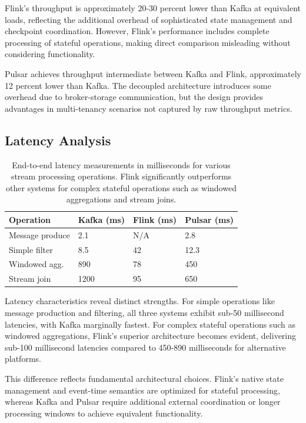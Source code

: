 \documentclass[10pt,twocolumn]{article}
\begin{document}
Flink's throughput is approximately 20-30 percent lower than Kafka at equivalent loads, reflecting the additional overhead of sophisticated state management and checkpoint coordination. However, Flink's performance includes complete processing of stateful operations, making direct comparison misleading without considering functionality.

Pulsar achieves throughput intermediate between Kafka and Flink, approximately 12 percent lower than Kafka. The decoupled architecture introduces some overhead due to broker-storage communication, but the design provides advantages in multi-tenancy scenarios not captured by raw throughput metrics.

\subsection{Latency Analysis}

\begin{table}[h]
\centering
\small
\begin{tabularx}{\columnwidth}{|l|X|X|X|}
\toprule
\textbf{Operation} & \textbf{Kafka (ms)} & \textbf{Flink (ms)} & \textbf{Pulsar (ms)} \\
\midrule
Message produce & 2.1 & N/A & 2.8 \\
Simple filter & 8.5 & 42 & 12.3 \\
Windowed agg. & 890 & 78 & 450 \\
Stream join & 1200 & 95 & 650 \\
\bottomrule
\end{tabularx}
\caption{End-to-end latency measurements in milliseconds for various stream processing operations. Flink significantly outperforms other systems for complex stateful operations such as windowed aggregations and stream joins.}
\label{table:latency}
\end{table}

Latency characteristics reveal distinct strengths. For simple operations like message production and filtering, all three systems exhibit sub-50 millisecond latencies, with Kafka marginally fastest. For complex stateful operations such as windowed aggregations, Flink's superior architecture becomes evident, delivering sub-100 millisecond latencies compared to 450-890 milliseconds for alternative platforms.

This difference reflects fundamental architectural choices. Flink's native state management and event-time semantics are optimized for stateful processing, whereas Kafka and Pulsar require additional external coordination or longer processing windows to achieve equivalent functionality.
\end{document}
